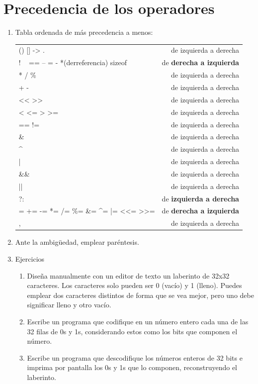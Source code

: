 \documentclass[a4paper,oneside]{article}
\begin{document}
\section{Precedencia de los operadores}
  \begin{enumerate}
  \item Tabla ordenada de más precedencia a menos:

  \begin{tabular}{ l r }
() [] -> . & de izquierda a derecha \\
! ~ == -- = - *(derreferencia) sizeof & de \textbf{derecha a izquierda} \\
* / \% & de izquierda a derecha \\
+ - & de izquierda a derecha \\
<< >> & de izquierda a derecha \\
< <= > >= & de izquierda a derecha \\
== != & de izquierda a derecha \\
\& & de izquierda a derecha \\
\^{} & de izquierda a derecha \\
| & de izquierda a derecha \\
\&\& & de izquierda a derecha \\
|| & de izquierda a derecha \\
?: & de \textbf{izquierda a derecha} \\
= += -= *= /= \%= \&= \^{}= |= <<= >>= & de \textbf{derecha a izquierda} \\
, & de izquierda a derecha \\
\end{tabular}
  \item Ante la ambigüedad, emplear paréntesis.
  \item Ejercicios
    \begin{enumerate}
      \item Diseña manualmente con un editor de texto un laberinto de 32x32 caracteres. Los caracteres solo pueden ser 0 (vacío) y 1 (lleno). Puedes emplear dos caracteres distintos de forma que se vea mejor, pero uno debe significar lleno y otro vacío.
      \item Escribe un programa que codifique en un número entero cada una de las 32 filas de 0s y 1s, considerando estos como los bits que componen el número.
      \item Escribe un programa que descodifique los números enteros de 32 bits e imprima por pantalla los 0s y 1s que lo componen, reconstruyendo el laberinto.
    \end{enumerate}
  \end{enumerate}
\end{document}

